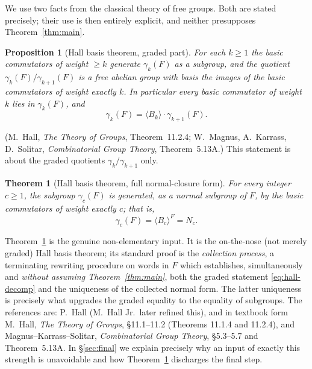 \documentclass{amsart}
\newtheorem{theorem}{Theorem}
\newtheorem{proposition}{Proposition}
\theoremstyle{definition}
\theoremstyle{remark}
\begin{document}
We use two facts from the classical theory of free groups. Both are stated
precisely; their use is then entirely explicit, and neither presupposes
Theorem~\ref{thm:main}.

\begin{proposition}[Hall basis theorem, graded part]\label{prop:hall}
For each $k\ge 1$ the basic commutators of weight $\ge k$ generate $\gamma_k(F)$
as a subgroup, and the quotient $\gamma_k(F)/\gamma_{k+1}(F)$ is a free abelian
group with basis the images of the basic commutators of weight exactly $k$. In
particular every basic commutator of weight $k$ lies in $\gamma_k(F)$, and
\begin{equation}\label{eq:hall-decomp}
\gamma_k(F)=\langle B_k\rangle\cdot\gamma_{k+1}(F).
\end{equation}
\end{proposition}

\noindent
(M.\ Hall, \emph{The Theory of Groups}, Theorem~11.2.4; W.\ Magnus, A.\ Karrass,
D.\ Solitar, \emph{Combinatorial Group Theory}, Theorem~5.13A.) This statement is
about the graded quotients $\gamma_k/\gamma_{k+1}$ only.

\begin{theorem}[Hall basis theorem, full normal-closure form]\label{thm:hall-full}
For every integer $c\ge1$, the subgroup $\gamma_c(F)$ is generated, as a
\emph{normal} subgroup of $F$, by the basic commutators of weight exactly $c$;
that is,
\[
\gamma_c(F)=\langle B_c\rangle^{F}=N_c .
\]
\end{theorem}

\noindent
Theorem~\ref{thm:hall-full} is the genuine non-elementary input. It is the
on-the-nose (not merely graded) Hall basis theorem; its standard proof is the
\emph{collection process}, a terminating rewriting procedure on words in $F$ which
establishes, simultaneously and \emph{without assuming
Theorem~\ref{thm:main}}, both the graded statement \eqref{eq:hall-decomp} and the
uniqueness of the collected normal form. The latter uniqueness is precisely what
upgrades the graded equality to the equality of subgroups. The references are: P.\
Hall (M.\ Hall Jr.\ later refined this), and in textbook form M.\ Hall,
\emph{The Theory of Groups}, \S11.1--11.2 (Theorems 11.1.4 and 11.2.4), and
Magnus--Karrass--Solitar, \emph{Combinatorial Group Theory}, \S5.3--5.7 and
Theorem~5.13A. In \S\ref{sec:final} we explain precisely why an input of exactly
this strength is unavoidable and how Theorem~\ref{thm:hall-full} discharges the
final step.
\end{document}
